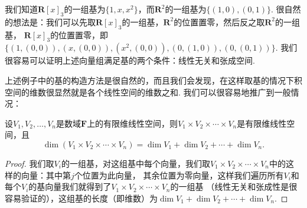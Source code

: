 \begin{solution}
    我们知道$\mathbf{R}[x]_3$的一组基为$\{1,x,x^2\}$，而$\mathbf{R}^2$的一组基为$\{(1,0),(0,1)\}$.
    很自然的想法是：我们可以先取$\mathbf{R}[x]_3$的一组基，$\mathbf{R}^2$的位置置零，然后反之取$\mathbf{R}^2$的一组基，
    $\mathbf{R}[x]_3$的位置置零，即$\{(1,(0,0)),(x,(0,0)),(x^2,(0,0)),(0,(1,0)),(0,(0,1))\}$.
    我们很容易可以证明上述向量组满足基的两个条件：线性无关和张成空间.
\end{solution}

上述例子中的基的构造方法是很自然的，而且我们会发现，在这样取基的情况下积空间的维数很显然就是各个线性空间的维数之和.
我们可以很容易地推广到一般情况：
\begin{theorem}\label{thm:8:积空间维数}
    设$V_1,V_2,\ldots,V_n$是数域$\mathbf{F}$上的有限维线性空间，则$V_1 \times V_2 \times \cdots \times V_n$是有限维线性空间，且
    \[\dim(V_1 \times V_2 \times \cdots \times V_n)=\dim V_1+\dim V_2+\cdots+\dim V_n.\]
\end{theorem}
\begin{proof}
    我们取$V_i$的一组基，对这组基中每个向量，我们取$V_1 \times V_2 \times \cdots \times V_n$中的这样的向量：其中第$j$个位置为此向量，
    其余位置为零向量，这样我们遍历所有$V_i$和每个$V_i$的基向量我们就得到了$V_1 \times V_2 \times \cdots \times V_n$的一组基
    （线性无关和张成性是很容易验证的），这组基的长度（即维数）为$\dim V_1+\dim V_2+\cdots+\dim V_n$.
\end{proof}

